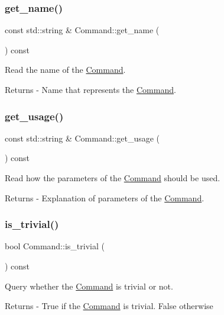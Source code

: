 \subsubsection{\texorpdfstring{get\+\_\+name()}{get\_name()}}
{\footnotesize\ttfamily const std\+::string \& Command\+::get\+\_\+name (\begin{DoxyParamCaption}{ }\end{DoxyParamCaption}) const}

Read the name of the \mbox{\hyperlink{class_command}{Command}}. \begin{DoxyReturn}{Returns}
-\/ Name that represents the \mbox{\hyperlink{class_command}{Command}}. 
\end{DoxyReturn}
\mbox{\label{class_command_a0a07c4f1b9b78074268653129bbd6cbb}} 
\subsubsection{\texorpdfstring{get\+\_\+usage()}{get\_usage()}}
{\footnotesize\ttfamily const std\+::string \& Command\+::get\+\_\+usage (\begin{DoxyParamCaption}{ }\end{DoxyParamCaption}) const}

Read how the parameters of the \mbox{\hyperlink{class_command}{Command}} should be used. \begin{DoxyReturn}{Returns}
-\/ Explanation of parameters of the \mbox{\hyperlink{class_command}{Command}}. 
\end{DoxyReturn}
\mbox{\label{class_command_a2b9c29afe3b2fd50ef1c8664eec56aec}} 
\subsubsection{\texorpdfstring{is\+\_\+trivial()}{is\_trivial()}}
{\footnotesize\ttfamily bool Command\+::is\+\_\+trivial (\begin{DoxyParamCaption}{ }\end{DoxyParamCaption}) const}

Query whether the \mbox{\hyperlink{class_command}{Command}} is trivial or not. \begin{DoxyReturn}{Returns}
-\/ True if the \mbox{\hyperlink{class_command}{Command}} is trivial. False otherwise 
\end{DoxyReturn}
\mbox{\label{class_command_a325860d97ad7b70553e3097321ee9952}} 

